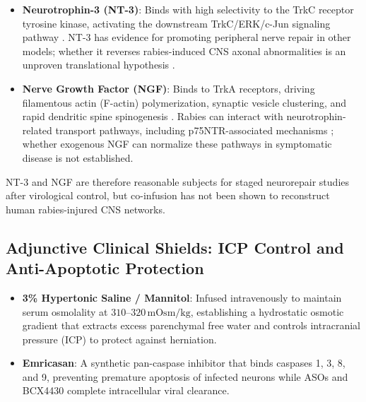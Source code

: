 \documentclass[12pt,a4paper]{article}
\begin{document}
\begin{itemize}
    \item \textbf{Neurotrophin-3 (NT-3)}: Binds with high selectivity to the TrkC receptor tyrosine kinase, activating the downstream TrkC/ERK/c-Jun signaling pathway \citep{xu2023nt3}. NT-3 has evidence for promoting peripheral nerve repair in other models; whether it reverses rabies-induced CNS axonal abnormalities is an unproven translational hypothesis \citep{xu2023nt3}.
    \item \textbf{Nerve Growth Factor (NGF)}: Binds to TrkA receptors, driving filamentous actin (F-actin) polymerization, synaptic vesicle clustering, and rapid dendritic spine spinogenesis \citep{gluska2014p75}. Rabies can interact with neurotrophin-related transport pathways, including p75NTR-associated mechanisms \citep{gluska2014p75}; whether exogenous NGF can normalize these pathways in symptomatic disease is not established.
\end{itemize}
NT-3 and NGF are therefore reasonable subjects for staged neurorepair studies after virological control, but co-infusion has not been shown to reconstruct human rabies-injured CNS networks.

\subsection{Adjunctive Clinical Shields: ICP Control and Anti-Apoptotic Protection}

\begin{itemize}
    \item \textbf{3\% Hypertonic Saline / Mannitol}: Infused intravenously to maintain serum osmolality at $310\text{--}320\,\mathrm{mOsm/kg}$, establishing a hydrostatic osmotic gradient that extracts excess parenchymal free water and controls intracranial pressure (ICP) to protect against herniation.
    \item \textbf{Emricasan}: A synthetic pan-caspase inhibitor that binds caspases 1, 3, 8, and 9, preventing premature apoptosis of infected neurons while ASOs and BCX4430 complete intracellular viral clearance.
\end{itemize}
\end{document}
